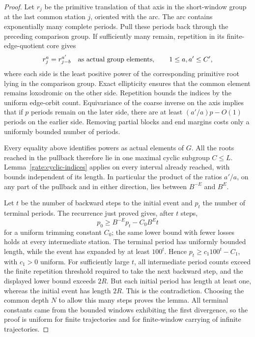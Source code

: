 \begin{proof}
Let $r_j$ be the primitive translation of that axis in the short-window
group at the last common station $j$, oriented with the arc.  The arc
contains exponentially many complete periods.  Pull these periods back
through the preceding comparison group.  If sufficiently many remain,
repetition in its finite-edge-quotient core gives
\[
 r_j^a=r_{j-b}^{a'}
 \quad\hbox{as actual group elements},\qquad
 1\le a,a'\le C',
\]
where each side is the least positive power of the corresponding primitive
root lying in the comparison group.  Exact ellipticity ensures that the
common element remains loxodromic on the other side.  Repetition bounds
the indices by the uniform edge-orbit count.  Equivariance of the coarse
inverse on the axis implies that if $p$ periods remain on the later side,
there are at least $(a'/a)p-O(1)$ periods on the earlier side.  Removing
partial blocks and end margins costs only a uniformly bounded number of
periods.

Every equality above identifies powers as actual elements of \(G\).
All the roots reached in the pullback therefore lie in one maximal
cyclic subgroup \(C\le L\). Lemma~\ref{gate:cyclic-indices} applies
on every interval already reached, with bounds independent of its
length. In particular the product of the ratios \(a'/a\), on any
part of the pullback and in either direction, lies between
\(B^{-E}\) and \(B^E\).

Let \(t\) be the number of backward steps to the initial event and
\(p_t\) the number of terminal periods. The recurrence just proved
gives, after \(t\) steps,
\[
 p_0\ge B^{-E}p_t-C_0B^E t
\]
for a uniform trimming constant \(C_0\); the same lower bound with
fewer losses holds at every intermediate station. The terminal
period has uniformly bounded length, while the event has expanded
by at least \(100^t\). Hence \(p_t\ge c_1 100^t-C_1\), with
\(c_1>0\) uniform. For sufficiently large \(t\), all intermediate
period counts exceed the finite repetition threshold required to
take the next backward step, and the displayed lower bound exceeds
\(2R\). But each initial period has length at least one, whereas
the initial event has length \(2R\). This is the contradiction.
Choosing the common depth \(N\) to allow this many steps proves the
lemma. All terminal constants came from the bounded windows
exhibiting the first divergence, so the proof is uniform for finite
trajectories and for finite-window carrying of infinite trajectories.
\end{proof}

